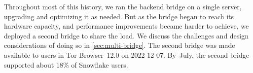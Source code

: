 \documentclass[letterpaper,twocolumn]{article}
\begin{document}
Throughout most of this history,
we ran the backend bridge on a single server,
upgrading and optimizing it as needed.
But as the bridge began to reach its hardware capacity,
and performance improvements became harder to achieve,
we deployed a second bridge to share the load.
We discuss the challenges and design considerations of doing so in \autoref{sec:multi-bridge}.
The second bridge was made available to users in
Tor Browser~12.0 on \mbox{2022-12-07}.
By~July, the second bridge supported about 18\% of Snowflake users.
\end{document}
